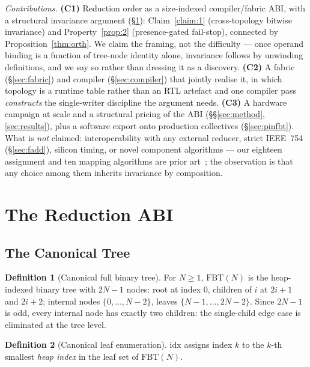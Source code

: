 \documentclass[journal,10pt]{IEEEtran}
\theoremstyle{plain}
\theoremstyle{definition}
\newtheorem{definition}{Definition}
\theoremstyle{remark}
\newcommand{\FBT}{\ensuremath{\mathrm{FBT}}}
\begin{document}
\emph{Contributions.} \textbf{(C1)} Reduction order as a size-indexed
compiler/fabric ABI, with a structural invariance argument
(\S\ref{sec:abi}): Claim~\ref{claim:1} (cross-topology bitwise invariance)
and Property~\ref{prop:2} (presence-gated fail-stop), connected by
Proposition~\ref{thm:orth}. We claim the framing, not the difficulty --- once
operand binding is a function of tree-node identity alone, invariance follows
by unwinding definitions, and we say so rather than dressing it as a
discovery. \textbf{(C2)} A fabric (\S\ref{sec:fabric}) and compiler
(\S\ref{sec:compiler}) that jointly realise it, in which topology is a runtime
table rather than an RTL artefact and one compiler pass \emph{constructs} the
single-writer discipline the argument needs. \textbf{(C3)} A hardware campaign
at scale and a structural pricing of the ABI (\S\S\ref{sec:method},
\ref{sec:results}), plus a software export onto production collectives
(\S\ref{sec:pinfbt}). What is \emph{not} claimed: interoperability with any
external reducer, strict IEEE~754 (\S\ref{sec:fadd}), silicon timing, or novel
component algorithms --- our eighteen assignment and ten mapping algorithms
are prior art~\cite{topcuoglu2002heft,lukes1974efficient,dally2004principles};
the observation is that any choice among them inherits invariance by
composition.


\section{The Reduction ABI}\label{sec:abi}

\subsection{The Canonical Tree}\label{sec:abi-tree}

\begin{definition}[Canonical full binary tree]\label{def:fbt}
For $N \geq 1$, $\FBT(N)$ is the heap-indexed binary tree with $2N-1$ nodes:
root at index $0$, children of $i$ at $2i+1$ and $2i+2$; internal nodes
$\{0,\ldots,N-2\}$, leaves $\{N-1,\ldots,2N-2\}$. Since $2N-1$ is odd, every
internal node has exactly two children: the single-child edge case is
eliminated at the tree level.
\end{definition}

\begin{definition}[Canonical leaf enumeration]\label{def:leafenum}
$\mathrm{idx}$ assigns index $k$ to the $k$-th smallest \emph{heap index} in
the leaf set of $\FBT(N)$.
\end{definition}
\end{document}
